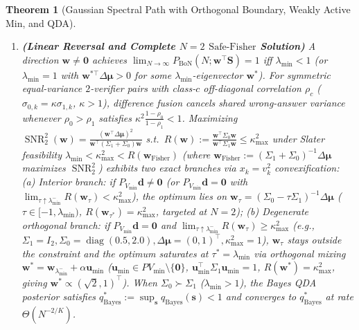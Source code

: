 \documentclass[10pt]{article}
\theoremstyle{plain}
\newtheorem{theorem}{Theorem}
\theoremstyle{definition}
\theoremstyle{remark}
\newcommand{\SNR}{\operatorname{SNR}}
\begin{document}
\begin{theorem}[Gaussian Spectral Path with Orthogonal Boundary, Weakly Active $\mathrm{Min}$, and QDA]
\begin{enumerate}[leftmargin=1.6em,itemsep=2pt,topsep=1pt]
    \item \textbf{(Linear Reversal and Complete $N=2$ $\mathrm{Safe\text{-}Fisher}$ Solution)} A direction $\mathbf{w} \neq \mathbf{0}$ achieves $\lim_{N\to\infty}\allowbreak P_{\mathrm{BoN}}(N;\allowbreak \mathbf{w}^\top\mathbf{S}) = 1$ iff $\lambda_{\min} < 1$ (or $\lambda_{\min} = 1$ with $\mathbf{w}^{*\top}\Delta\boldsymbol{\mu} > 0$ for some $\lambda_{\min}$-eigenvector $\mathbf{w}^*$). For symmetric equal-variance $2$-verifier pairs with class-$c$ off-diagonal correlation $\rho_c$ ($\sigma_{0,k} = \kappa\sigma_{1,k}$, $\kappa > 1$), difference fusion cancels shared wrong-answer variance whenever $\rho_0 > \rho_1$ satisfies $\kappa^2\frac{1-\rho_0}{1-\rho_1} < 1$. Maximizing $\SNR_2^2(\mathbf{w}) = \frac{(\mathbf{w}^\top\Delta\boldsymbol{\mu})^2}{\mathbf{w}^\top(\Sigma_1+\Sigma_0)\mathbf{w}}$ s.t.\ $R(\mathbf{w}) := \frac{\mathbf{w}^\top\Sigma_0\mathbf{w}}{\mathbf{w}^\top\Sigma_1\mathbf{w}} \le \kappa_{\max}^2$ under Slater feasibility $\lambda_{\min} < \kappa_{\max}^2 < R(\mathbf{w}_{\mathrm{Fisher}})$ (where $\mathbf{w}_{\mathrm{Fisher}} := (\Sigma_1 + \Sigma_0)^{-1}\Delta\boldsymbol{\mu}$ maximizes $\SNR_2^2$) exhibits two exact branches via $x_k = v_k^2$ convexification: \emph{(a) Interior branch:} if $P_{V_{\min}}\mathbf{d} \neq \mathbf{0}$ (or $P_{V_{\min}}\mathbf{d} = \mathbf{0}$ with $\lim_{\tau \uparrow \lambda_{\min}^-} R(\mathbf{w}_\tau) < \kappa_{\max}^2$), the optimum lies on $\mathbf{w}_\tau = (\Sigma_0 - \tau\Sigma_1)^{-1}\Delta\boldsymbol{\mu}$ ($\tau \in [-1, \lambda_{\min})$, $R(\mathbf{w}_{\tau^*}) = \kappa_{\max}^2$, targeted at $N=2$); \emph{(b) Degenerate orthogonal branch:} if $P_{V_{\min}}\mathbf{d} = \mathbf{0}$ and $\lim_{\tau \uparrow \lambda_{\min}^-} R(\mathbf{w}_\tau) \ge \kappa_{\max}^2$ (e.g., $\Sigma_1 = I_2, \Sigma_0 = \operatorname{diag}(0.5, 2.0), \Delta\boldsymbol{\mu} = (0,1)^\top, \kappa_{\max}^2 = 1$), $\mathbf{w}_\tau$ stays outside the constraint and the optimum saturates at $\tau^* = \lambda_{\min}$ via orthogonal mixing $\mathbf{w}^* = \mathbf{w}_{\lambda_{\min}^-} + \alpha\mathbf{u}_{\min}$ ($\mathbf{u}_{\min} \in P V_{\min}\setminus\{\mathbf{0}\}$, $\mathbf{u}_{\min}^\top \Sigma_1 \mathbf{u}_{\min} = 1$, $R(\mathbf{w}^*) = \kappa_{\max}^2$, giving $\mathbf{w}^* \propto (\sqrt{2}, 1)^\top$). When $\Sigma_0 \succ \Sigma_1$ ($\lambda_{\min} > 1$), the Bayes QDA posterior satisfies $q^*_{\mathrm{Bayes}} := \sup_{\mathbf{s}} q_{\mathrm{Bayes}}(\mathbf{s}) < 1$ and converges to $q^*_{\mathrm{Bayes}}$ at rate $\Theta(N^{-2/K})$.

\end{enumerate}
\end{theorem}
\end{document}
